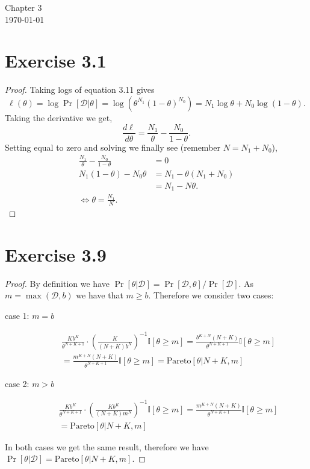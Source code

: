 \documentclass[12pt]{article}
\newcommand{\I}{\mathbb{I}}
\newcommand{\D}{\mathcal{D}}
\begin{document}
\begin{center}
{\Large Chapter 3}\\
\today
\end{center}
\section*{Exercise 3.1}
\begin{proof}
Taking logs of equation 3.11 gives
\[\ell(\theta) = \log \Pr[\D|\theta] = \log\left(\theta^{N_1}(1 - \theta)^{N_0} \right) = N_1 \log \theta + N_0 \log (1 - \theta).\] 
Taking the derivative we get,
\[\frac{d \ell}{d \theta} = \frac{N_1}{\theta} - \frac{N_0}{1 - \theta}.\]
Setting equal to zero and solving we finally see (remember $N = N_1 + N_0$),
\begin{align*}
    \frac{N_1}{\theta} - \frac{N_0}{1 - \theta} &= 0\\
    N_1 (1 - \theta) - N_0 \theta &= N_1 - \theta(N_1 + N_0)\\
    &= N_1 - N\theta.\\
    \iff \theta = \frac{N_1}{N}.
\end{align*}
\end{proof}
\section*{Exercise 3.9}
\begin{proof}
By definition we have $\Pr[\theta | \D]  = \Pr[\D, \theta] / \Pr[\D]$.
As $m = \max (\D, b)$ we have that $m \geq b$. Therefore we consider two cases:
\begin{description}
    \item[case 1: $m = b$]
        \begin{align*}
            \frac{Kb^K}{\theta^{N + K + 1}} \cdot \left(\frac{K}{(N + K)b^N}\right)^{-1} \I[\theta \geq m]
            = \frac{b^{K + N}(N+K)}{\theta^{N + K + 1}} \I[\theta \geq m]\\
            = \frac{m^{K + N}(N+K)}{\theta^{N + K + 1}} \I[\theta \geq m]
            = \text{Pareto}[\theta | N + K, m]
        \end{align*}
    \item[case 2: $m > b$]
        \begin{align*}
            \frac{Kb^K}{\theta^{N + K + 1}} \cdot \left(\frac{Kb^K}{(N + K)m^N}\right)^{-1} \I[\theta \geq m]
            = \frac{m^{K + N}(N+K)}{\theta^{N + K + 1}} \I[\theta \geq m]\\
            = \text{Pareto}[\theta | N + K, m]
        \end{align*}
\end{description}
In both cases we get the same result, therefore we have
$\Pr[\theta|\D] = \text{Pareto}[\theta| N + K, m]$.  \end{proof}
\end{document}
